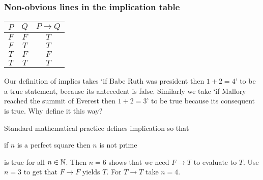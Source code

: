 \documentclass[10pt,t]{beamer}
\begin{document}
\begin{frame}
  \frametitle{Non-obvious lines in the implication table}
\begin{center}
  \begin{tabular}{cc|c}
    $P$  &$Q$  &$P \rightarrow Q$  \\ \hline
    $F$  &$F$  &$T$          \\
    $F$  &$T$  &$T$          \\
    $T$  &$F$  &$F$          \\
    $T$  &$T$  &$T$     
  \end{tabular}
\end{center}
Our definition of implies takes
`if Babe Ruth was president then $1+2=4$'
to be a true statement, 
because its antecedent is false.
Similarly we take
`if Mallory reached the summit of Everest then $1+2=3$' 
to be true because its consequent is true.
Why define it this way?

\pause
Standard mathematical practice defines implication so that
\begin{center}
  if $n$ is a perfect square then $n$ is not prime
\end{center}
is true for all $n\in\mathbb{N}$.
\pause  Then $n=6$ shows that we need $F\rightarrow T$ to evaluate to $T$.  
\pause Use $n=3$ to get that $F\rightarrow F$ yields $T$.
\pause For $T\rightarrow T$ take $n=4$.
\end{frame}
\end{document}
